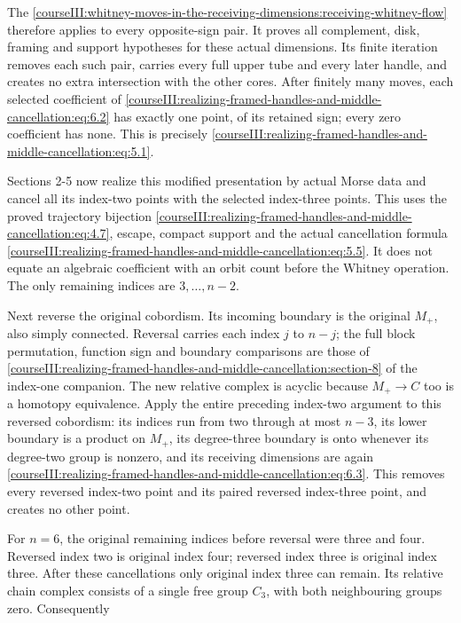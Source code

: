 The \cref{courseIII:whitney-moves-in-the-receiving-dimensions:receiving-whitney-flow} therefore applies to every opposite-sign pair. It proves all complement, disk, framing and support hypotheses for these actual dimensions. Its finite iteration removes each such pair, carries every full upper tube and every later handle, and creates no extra intersection with the other cores. After finitely many moves, each selected coefficient of \eqref{courseIII:realizing-framed-handles-and-middle-cancellation:eq:6.2} has exactly one point, of its retained sign; every zero coefficient has none. This is precisely \eqref{courseIII:realizing-framed-handles-and-middle-cancellation:eq:5.1}.

Sections 2-5 now realize this modified presentation by actual Morse data and cancel all its index-two points with the selected index-three points. This uses the proved trajectory bijection \eqref{courseIII:realizing-framed-handles-and-middle-cancellation:eq:4.7}, escape, compact support and the actual cancellation formula \eqref{courseIII:realizing-framed-handles-and-middle-cancellation:eq:5.5}. It does not equate an algebraic coefficient with an orbit count before the Whitney operation. The only remaining indices are \(3,\ldots,n-2\).

Next reverse the original cobordism. Its incoming boundary is the original \(M_+\), also simply connected. Reversal carries each index \(j\) to \(n-j\); the full block permutation, function sign and boundary comparisons are those of \cref{courseIII:realizing-framed-handles-and-middle-cancellation:section-8} of the index-one companion. The new relative complex is acyclic because \(M_+\to C\) too is a homotopy equivalence. Apply the entire preceding index-two argument to this reversed cobordism: its indices run from two through at most \(n-3\), its lower boundary is a product on \(M_+\), its degree-three boundary is onto whenever its degree-two group is nonzero, and its receiving dimensions are again \eqref{courseIII:realizing-framed-handles-and-middle-cancellation:eq:6.3}. This removes every reversed index-two point and its paired reversed index-three point, and creates no other point.

For \(n=6\), the original remaining indices before reversal were three and four. Reversed index two is original index four; reversed index three is original index three. After these cancellations only original index three can remain. Its relative chain complex consists of a single free group \(C_3\), with both neighbouring groups zero. Consequently

